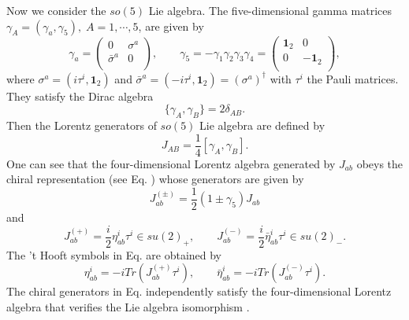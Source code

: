 \documentclass[12pt,epsf]{article}
\begin{document}
Now we consider the $so(5)$ Lie algebra.
The five-dimensional gamma matrices $\gamma_A = (\gamma_a, \gamma_5), \; A=1, \cdots, 5$, are given by
\begin{equation}\label{5-gamma}
  \gamma_a = \left(
               \begin{array}{cc}
                 0 & \sigma^a \\
                 \bar{\sigma}^a & 0 \\
               \end{array}
             \right), \qquad \gamma_5 = -\gamma_1 \gamma_2 \gamma_3 \gamma_4 = \left(
                                                                        \begin{array}{cc}
                                                                          \mathbf{1}_2 & 0 \\
                                                                          0 & - \mathbf{1}_2 \\
                                                                        \end{array}
                                                                      \right),
\end{equation}
where $\sigma^a = (i \tau^i, \mathbf{1}_2 )$ and $\bar{\sigma}^a = (-i \tau^i, \mathbf{1}_2 ) = (\sigma^a)^\dagger$
with $\tau^i$ the Pauli matrices.
They satisfy the Dirac algebra
\begin{equation}\label{5-dirac}
  \{\gamma_A, \gamma_B \} = 2 \delta_{AB}.
\end{equation}
Then the Lorentz generators of $so(5)$ Lie algebra are defined by
\begin{equation}\label{5-gen}
  J_{AB} = \frac{1}{4} [\gamma_A, \gamma_B].
\end{equation}
One can see that the four-dimensional Lorentz algebra generated by $J_{ab}$ obeys the chiral representation
(see Eq. ) whose generators are given by
\begin{equation}\label{4-chiral}
J_{ab}^{(\pm)} = \frac{1}{2} (1 \pm \gamma_5) J_{ab}
\end{equation}
and
\begin{equation}\label{2-chiral}
J_{ab}^{(+)} = \frac{i}{2} \eta^i_{ab} \tau^i \in su(2)_+, \qquad
J_{ab}^{(-)} = \frac{i}{2} \bar{\eta}^i_{ab} \tau^i \in su(2)_-.
\end{equation}
The 't Hooft symbols in Eq.  are obtained by
\begin{equation}\label{chiral-thooft}
  \eta^i_{ab} = -i Tr (  J_{ab}^{(+)} \tau^i ), \qquad \bar{\eta}^i_{ab} = -i Tr (  J_{ab}^{(-)} \tau^i ).
\end{equation}
The chiral generators in Eq.  independently satisfy the four-dimensional Lorentz algebra that verifies
the Lie algebra isomorphism .
\end{document}
